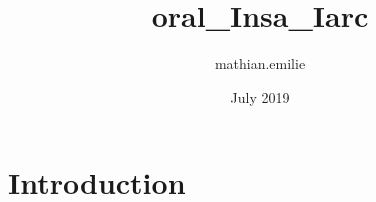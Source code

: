 \documentclass{article}
\title{oral_Insa_Iarc}
\author{mathian.emilie }
\date{July 2019}
\begin{document}
\maketitle

\section{Introduction}
\end{document}
